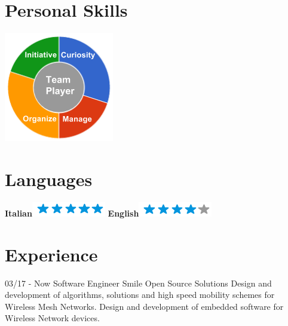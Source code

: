 \documentclass[]{friggeri-cv}
\begin{document}
\begin{aside}
	\section{Personal Skills}
	\includegraphics[scale=0.62]{img/personal.png}
	~
	\section{Languages}
	\textbf{Italian}\includegraphics[scale=0.40]{img/5stars.png}
	\textbf{English}\includegraphics[scale=0.40]{img/4stars.png}
\end{aside}

\section{Experience}
\begin{entrylist}
	\entry
	{03/17 - Now}
	{Software Engineer}
	{Smile Open Source Solutions}
	{Design and development of algorithms, solutions and high speed mobility           schemes for Wireless Mesh Networks. Design and development of embedded software     for Wireless Network devices.\\}
\end{entrylist}
\end{document}
